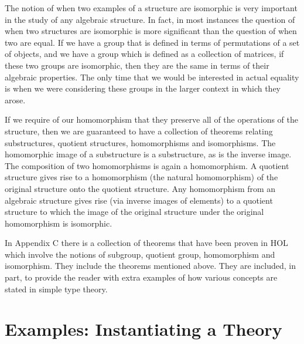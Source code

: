 The notion of when two examples of a structure are isomorphic is very
important in the study of any algebraic structure.  In fact, in most
instances the question of when two structures are isomorphic is more
significant than the question of when two are equal.  If we have a
group that is defined in terms of permutations of a set of objects, and
we have a group which is defined as a collection of matrices, if these
two groups are isomorphic, then they are the same in terms of their
algebraic properties.  The only time that we would be interested in
actual equality is when we were considering these groups in the
larger context in which they arose.

If we require of our homomorphism that they preserve all of the
operations of the structure, then we are guaranteed to have a
collection of theorems relating substructures, quotient structures,
homomorphisms and isomorphisms.  The homomorphic image of a
substructure is a substructure, as is the inverse image.  The
composition of two homomorphisms is again a homomorphism.  A quotient
structure gives rise to a homomorphism (the natural homomorphism) of
the original structure onto the quotient structure.  Any homomorphism
from an algebraic structure gives rise (via inverse images of
elements) to a quotient structure to which the image of the original
structure under the original homomorphism is isomorphic.

In Appendix C there is a collection of theorems that have been proven
in HOL which involve the notions of subgroup, quotient group,
homomorphism and isomorphism.  They include the theorems mentioned
above.  They are included, in part, to provide the reader with extra
examples of how various concepts are stated in simple type theory.


\section{Examples: Instantiating a Theory}

